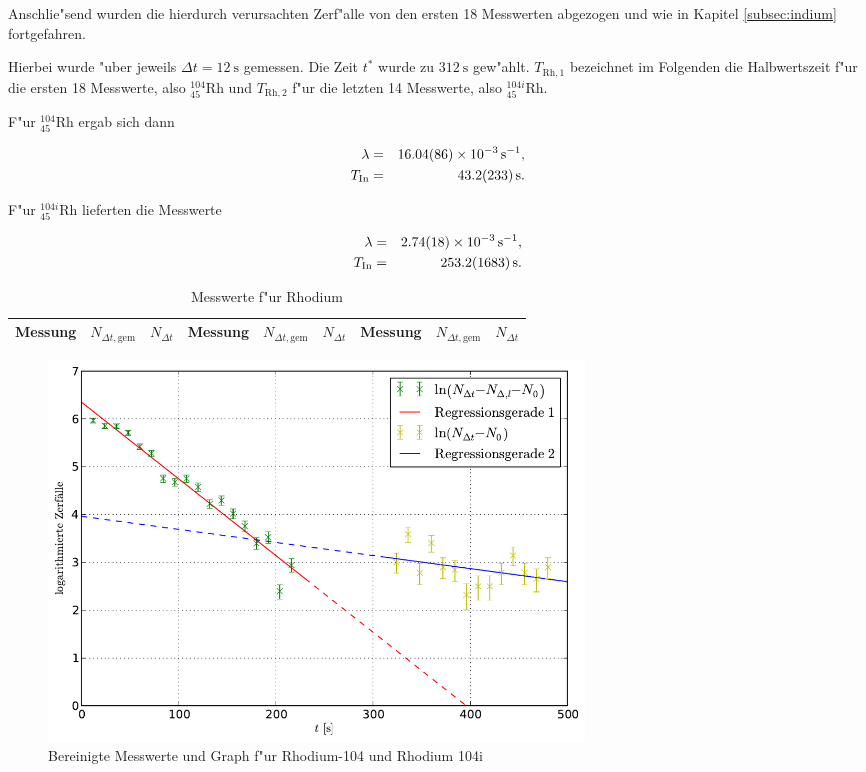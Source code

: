 		Anschlie"send wurden die hierdurch verursachten Zerf"alle von den ersten 18 Messwerten abgezogen und wie in Kapitel \ref{subsec:indium} fortgefahren.

		Hierbei wurde "uber jeweils $\Delta t = \SI{12}{\second}$ gemessen.
		Die Zeit $t^*$ wurde zu $\SI{312}{\second}$ gew"ahlt.
		$T_{\mathrm{Rh}, 1}$ bezeichnet im Folgenden die Halbwertszeit f"ur die ersten 18 Messwerte, also ${}_{45}^{104}\mathrm{Rh}$ und $T_{\mathrm{Rh}, 2}$ f"ur die letzten 14 Messwerte, also ${}_{45}^{104i}\mathrm{Rh}$.
		\newline


		F"ur ${}_{45}^{104}\mathrm{Rh}$ ergab sich dann

		\begin{eqnarray*}
			\lambda & = & \SI{16.04 (86)e-3}{\per \second} , \\
			T_\mathrm{In} & = & \SI{43.2 (233)}{\second} .
		\end{eqnarray*}

		F"ur ${}_{45}^{104i}\mathrm{Rh}$ lieferten die Messwerte

		\begin{eqnarray*}
			\lambda & = & \SI{2.74 (18)e-3}{\per \second} , \\
			T_\mathrm{In} & = & \SI{253.2 (1683)}{\second} .
		\end{eqnarray*}

		\clearpage

		\begin{table}[!h]
			\begin{center}
				\caption{Messwerte f"ur Rhodium}
				\label{tabelle:rhodium}
				\begin{tabular}{|c|c|c||c|c|c||c|c|c|}
					\hline 
					Messung & $N_{\Delta t, \mathrm{gem}}$ & $N_{\Delta t}$ & Messung & $N_{\Delta t, \mathrm{gem}}$ & $N_{\Delta t}$ & Messung & $N_{\Delta t, \mathrm{gem}}$ & $N_{\Delta t}$\\
					\hline 
					\hline
					
					\hline 
				\end{tabular}
			\end{center}
		\end{table}

		\enlargethispage{5cm}

		\begin{figure}[!h]
			\centering
			\includegraphics[width = 14.2cm]{img/graph_rhodium_linearisiert.pdf}
			\caption{Bereinigte Messwerte und Graph f"ur Rhodium-104 und Rhodium 104i}
			\label{fig:the_label}
		\end{figure}

		\clearpage
